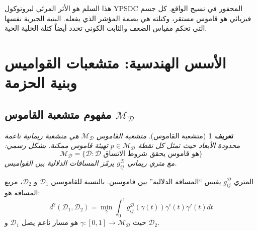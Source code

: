 \documentclass[11pt,a4paper]{article}
\newtheorem{definition}{تعريف}
\begin{document}
	هذا السلم هو الأثر المرئي لبروتوكول YPSDC المحفور في نسيج الواقع. كل جسم فيزيائي هو قاموس مستقر، وكتلته هي بصمة المؤشر الذي يفعله. البنية الجبرية نفسها التي تحكم مقياس الضعف والثابت الكوني تحدد أيضاً كتلة الخلية الحية.
	
	\section{الأسس الهندسية: متشعبات القواميس وبنية الحزمة}
	\subsection{مفهوم متشعبة القاموس $\mathcal{M}_{\mathcal{D}}$}
	
	\begin{definition}[متشعبة القاموس]
		متشعبة القاموس $\mathcal{M}_{\mathcal{D}}$ هي متشعبة ريمانية ناعمة محدودة الأبعاد حيث تمثل كل نقطة $p \in \mathcal{M}_{\mathcal{D}}$ تهيئة قاموس ممكنة. بشكل رسمي:
		\begin{equation}
			\mathcal{M}_{\mathcal{D}} = \{ \mathcal{D} : \mathcal{D} \text{ هو قاموس يحقق شروط الاتساق} \}
		\end{equation}
		مع متري ريماني $g_{ij}^{\mathcal{D}}$ يرمّز المسافات الدلالية بين القواميس.
	\end{definition}
	
	المتري $g_{ij}^{\mathcal{D}}$ يقيس ``المسافة الدلالية'' بين قاموسين. بالنسبة للقاموسين $\mathcal{D}_1$ و $\mathcal{D}_2$، مربع المسافة هو:
	\begin{equation}
		d^2(\mathcal{D}_1, \mathcal{D}_2) = \min_{\gamma} \int_0^1 g_{ij}^{\mathcal{D}}(\gamma(t)) \dot{\gamma}^i(t) \dot{\gamma}^j(t) dt
	\end{equation}
	حيث $\gamma: [0,1] \to \mathcal{M}_{\mathcal{D}}$ هو مسار ناعم يصل $\mathcal{D}_1$ و $\mathcal{D}_2$.
	
\end{document}

